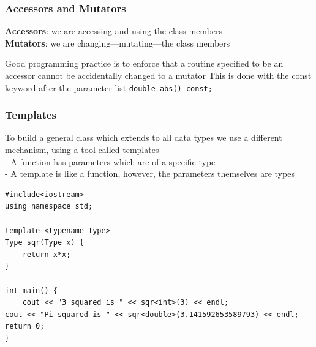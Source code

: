 \documentclass[11pt]{article}
\theoremstyle{definition}
\begin{document}
\subsubsection{Accessors and Mutators}
\textbf{Accessors}:	we are accessing and using the class members\\
\textbf{Mutators}: we are changing—mutating—the class members

Good programming practice is to enforce that a routine specified to be an accessor cannot be accidentally changed to a mutator
This is done with the const keyword after the parameter list \lstinline{double abs() const;}
\subsubsection{Templates}
To build a general class which extends to all data types we use a different mechanism, using a tool called templates\\
- A function has parameters which are of a specific type\\
- A template is like a function, however, the parameters themselves are types
\begin{lstlisting}
#include<iostream>
using namespace std;

template <typename Type>
Type sqr(Type x) {
    return x*x;
}
	
int main() {
    cout << "3 squared is " << sqr<int>(3) << endl;
cout << "Pi squared is " << sqr<double>(3.141592653589793) << endl;
return 0;
}
\end{lstlisting}
\newpage
\end{document}
